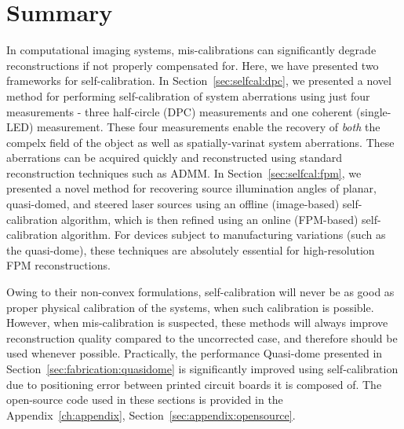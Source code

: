 \section{Summary}

In computational imaging systems, mis-calibrations can significantly degrade reconstructions if not properly compensated for. Here, we have presented two frameworks for self-calibration. In Section~\ref{sec:selfcal:dpc}, we presented a novel method for performing self-calibration of system aberrations using just four measurements - three half-circle (DPC) measurements and one coherent (single-LED) measurement. These four measurements enable the recovery of \textit{both} the compelx field of the object as well as spatially-varinat system aberrations. These aberrations can be acquired quickly and reconstructed using standard reconstruction techniques such as ADMM. In Section~\ref{sec:selfcal:fpm}, we presented a novel method for recovering source illumination angles of planar, quasi-domed, and steered laser sources using an offline (image-based) self-calibration algorithm, which is then refined using an online (FPM-based) self-calibration algorithm. For devices subject to manufacturing variations (such as the quasi-dome), these techniques are absolutely essential for high-resolution FPM reconstructions.

Owing to their non-convex formulations, self-calibration will never be as good as proper physical calibration of the systems, when such calibration is possible. However, when mis-calibration is suspected, these methods will always improve reconstruction quality compared to the uncorrected case, and therefore should be used whenever possible. Practically, the performance Quasi-dome presented in Section~\ref{sec:fabrication:quasidome} is significantly improved using self-calibration due to positioning error between printed circuit boards it is composed of. The open-source code used in these sections is provided in the Appendix~\ref{ch:appendix}, Section~\ref{sec:appendix:opensource}.